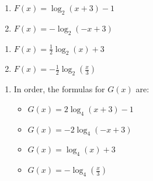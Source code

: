\documentclass{ximera}
\begin{document}
\newpage


\begin{multicols}{2}
\begin{enumerate}
\setcounter{enumi}{\value{HW}}
\addtocounter{enumi}{1}

\item $F(x) = \log_{2}(x+3) - 1$

\item  $F(x) = -\log_{2}(-x+3)$


\setcounter{HW}{\value{enumi}}
\end{enumerate}
\end{multicols}

\begin{multicols}{2}
\begin{enumerate}
\setcounter{enumi}{\value{HW}}


\item $F(x) = \frac{1}{2} \log_{2}(x) + 3$

\item  $F(x) = -\frac{1}{2} \log_{2} \left( \frac{x}{3} \right)$

\setcounter{HW}{\value{enumi}}
\end{enumerate}
\end{multicols}

\begin{enumerate}
\setcounter{enumi}{\value{HW}}

\item  In order, the formulas for $G(x)$ are:

\begin{multicols}{2}
\begin{itemize}

\item $G(x) = 2\log_{4}(x+3) - 1$

\item  $G(x) = -2\log_{4}(-x+3)$

\end{itemize}
\end{multicols}

\begin{multicols}{2}
\begin{itemize}

\item $G(x) =  \log_{4}(x) + 3$

\item  $G(x) = - \log_{4} \left( \frac{x}{3} \right)$

\end{itemize}
\end{multicols}


\setcounter{HW}{\value{enumi}}
\end{enumerate}
\end{document}
